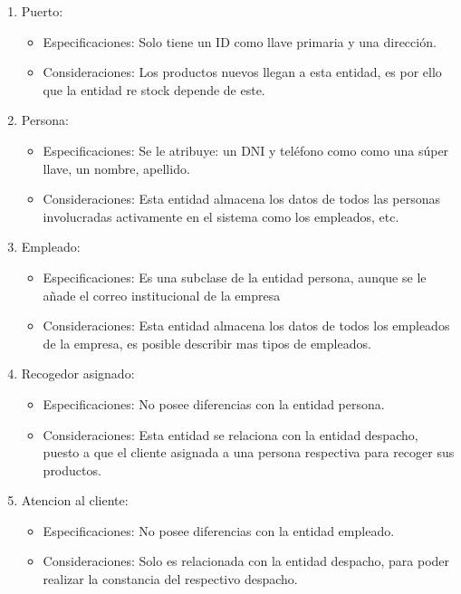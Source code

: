 \documentclass[10pt, a4paper,openany]{report}
\begin{document}
\begin{enumerate}
	\item  Puerto:
	      \begin{itemize}
		      \item Especificaciones:
		            Solo tiene un ID como llave primaria y una dirección.
		      \item Consideraciones:
		            Los productos nuevos llegan a esta entidad, es por ello que la entidad re stock depende de este.
	      \end{itemize}


	\item Persona:
	      \begin{itemize}
		      \item Especificaciones:
		            Se le atribuye: un DNI y teléfono como como una súper llave, un nombre, apellido.
		      \item Consideraciones:
		            Esta entidad almacena los datos de todos las personas involucradas activamente en el sistema como los empleados, etc.
	      \end{itemize}

	\item  Empleado:
	      \begin{itemize}
		      \item Especificaciones:
		            Es una subclase de la entidad persona, aunque se le añade el correo institucional de la empresa
		      \item Consideraciones:
		            Esta entidad almacena los datos de todos los empleados de la empresa, es posible describir mas tipos de empleados.
	      \end{itemize}

	\item  Recogedor asignado:
	      \begin{itemize}
		      \item Especificaciones:
		            No posee diferencias con la entidad persona.
		      \item Consideraciones:
		            Esta entidad se relaciona con la entidad despacho, puesto a que el cliente asignada a  una persona respectiva para recoger sus productos.
	      \end{itemize}

	\item Atencion al cliente:
	      \begin{itemize}
		      \item Especificaciones:
		            No posee diferencias con la entidad empleado.
		      \item Consideraciones:
		            Solo es relacionada con la entidad despacho, para poder realizar la constancia del respectivo despacho.
	      \end{itemize}


\end{enumerate}
\end{document}
